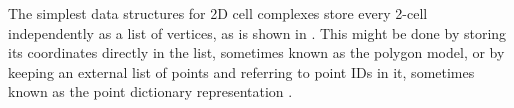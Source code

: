 The simplest data structures for 2D cell complexes store every 2-cell independently as a list of vertices, as is shown in .
This might be done by storing its coordinates directly in the list, sometimes known as the polygon model, or by keeping an external list of points and referring to point IDs in it, sometimes known as the point dictionary representation \citep{Peucker75}.


